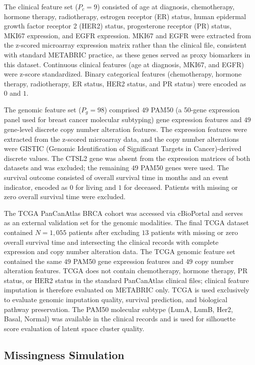 \documentclass[final,3p,times,authoryear]{elsarticle}
\begin{document}
The clinical feature set ($P_c = 9$) consisted of age at diagnosis, chemotherapy, hormone therapy, radiotherapy, estrogen receptor (ER) status, human epidermal growth factor receptor 2 (HER2) status, progesterone receptor (PR) status, MKI67 expression, and EGFR expression. MKI67 and EGFR were extracted from the z-scored microarray expression matrix rather than the clinical file, consistent with standard METABRIC practice, as these genes served as proxy biomarkers in this dataset. Continuous clinical features (age at diagnosis, MKI67, and EGFR) were z-score standardized. Binary categorical features (chemotherapy, hormone therapy, radiotherapy, ER status, HER2 status, and PR status) were encoded as $0$ and $1$. 

The genomic feature set ($P_g = 98$) comprised $49$ PAM50 (a 50-gene expression panel used for breast cancer molecular subtyping) gene expression features and $49$ gene-level discrete copy number alteration features. The expression features were extracted from the z-scored microarray data, and the copy number alterations were GISTIC (Genomic Identification of Significant Targets in Cancer)-derived discrete values. The CTSL2 gene was absent from the expression matrices of both datasets and was excluded; the remaining $49$ PAM50 genes were used. The survival outcome consisted of overall survival time in months and an event indicator, encoded as $0$ for living and $1$ for deceased. Patients with missing or zero overall survival time were excluded.

The TCGA PanCanAtlas BRCA cohort was accessed via cBioPortal and serves as an external validation set for the genomic modalities. The final TCGA dataset contained $N = 1{,}055$ patients after excluding $13$ patients with missing or zero overall survival time and intersecting the clinical records with complete expression and copy number alteration data. The TCGA genomic feature set contained the same $49$ PAM50 gene expression features and $49$ copy number alteration features. TCGA does not contain chemotherapy, hormone therapy, PR status, or HER2 status in the standard PanCanAtlas clinical files; clinical feature imputation is therefore evaluated on METABRIC only. TCGA is used exclusively to evaluate genomic imputation quality, survival prediction, and biological pathway preservation. The PAM50 molecular subtype (LumA, LumB, Her2, Basal, Normal) was available in the clinical records and is used for silhouette score evaluation of latent space cluster quality.


\subsection{Missingness Simulation}
\end{document}

